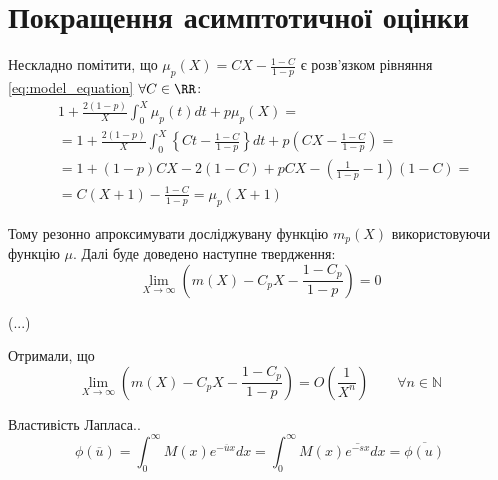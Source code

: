 \section{Покращення асимптотичної оцінки}

Нескладно помітити, що $\mu_{p}(X) = C X - \frac{1-C}{1 - p}$ є розв'язком рівняння \eqref{eq:model_equation} $\forall C \in \RR$:
\begin{align*}
&1 + \frac{2 (1-p)}{X} \int_{0}^{X} \mu_{p}(t) dt + p\mu_{p}(X) = \\
&=1 + \frac{2 (1-p)}{X} \int_{0}^{X} \left\{C t - \frac{1 - C}{1 - p} \right\} dt + p \left( C X - \frac{1 - C}{1 - p}\right) = \\
&=1 + (1 - p) C X - 2(1 - C) + p C X - (\frac{1}{1 - p} - 1)(1 - C) = \\
&= C(X + 1) - \frac{1 - C}{1 - p} = \mu_{p}(X+1)
\end{align*}

Тому резонно апроксимувати досліджувану функцію $m_{p}(X)$ використовуючи функцію $\mu$. Далі буде доведено наступне твердження:
\begin{equation}
\lim\limits_{X \rightarrow \infty} \left( m(X) - C_{p} X - \frac{1 - C_{p}}{1 - p} \right) = 0
\end{equation}

(...)

Отримали, що
\begin{equation}
\label{eq:uniform_right_as_enhanced}
\lim\limits_{X \rightarrow \infty} \left( m(X) - C_{p} X - \frac{1 - C_{p}}{1 - p} \right) = O\left(\frac{1}{X^{n}}\right) \qquad \forall n \in \mathbb{N}
\end{equation}

Властивість Лапласа..
\begin{equation}
\phi(\overline{u}) = \int_0^\infty M(x) e^{-\overline{u}x} dx = \int_0^\infty M(x) \overline{e^{-sx}} dx = \overline{\phi(u)}
\end{equation}